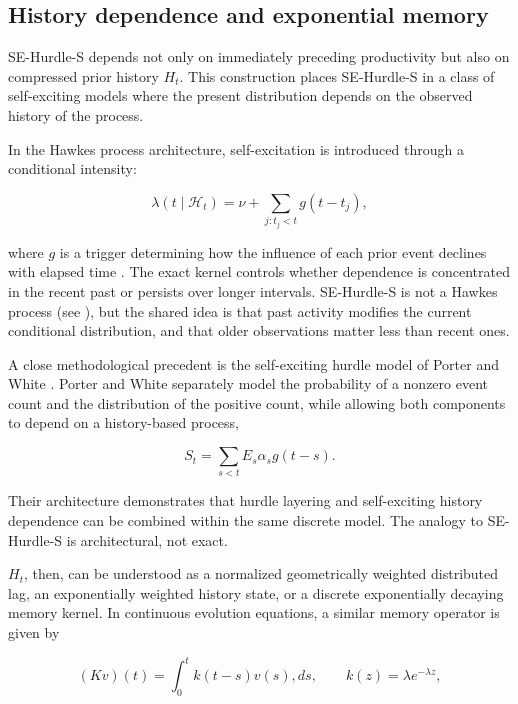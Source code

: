 \documentclass[twocolumn, letterpaper]{article}
\begin{document}
\subsection{History dependence and exponential memory}
\label{supp:support_of_se}

SE-Hurdle-S depends not only on immediately preceding productivity but also on compressed prior history $H_t$. This construction places SE-Hurdle-S in a class of self-exciting models where the present distribution depends on the observed history of the process. 

In the Hawkes process architecture, self-excitation is introduced through a conditional intensity:

\begin{equation}
\lambda(t\mid\mathcal H_t) = \nu+\sum_{j:t_j<t}g(t-t_j),
\label{eq:hawkes_history}
\end{equation}

where $g$ is a trigger determining how the influence of each prior event declines with elapsed time \citep{hawkes1971spectra,reinhart2018review}. The exact kernel controls whether dependence is concentrated in the recent past or persists over longer intervals. SE-Hurdle-S is not a Hawkes process (see ), but the shared idea is that past activity modifies the current conditional distribution, and that older observations matter less than recent ones.

A close methodological precedent is the self-exciting hurdle model of Porter and White \citep{porter2012selfexciting}. Porter and White separately model the probability of a nonzero event count and the distribution of the positive count, while allowing both components to depend on a history-based process,

\begin{equation}
S_t =
\sum_{s<t}E_s\alpha_s g(t-s).
\label{eq:shot_noise_history}
\end{equation}

Their architecture demonstrates that hurdle layering and self-exciting history dependence can be combined within the same discrete model. The analogy to SE-Hurdle-S is architectural, not exact. 

$H_t$, then, can be understood as a normalized geometrically weighted distributed lag, an exponentially weighted history state, or a discrete exponentially decaying memory kernel. In continuous evolution equations, a similar memory operator is given by

\begin{equation}
(Kv)(t) = \int_0^t k(t-s)v(s),ds, \qquad k(z)=\lambda e^{-\lambda z},
\label{eq:volterra_memory}
\end{equation}
\end{document}
